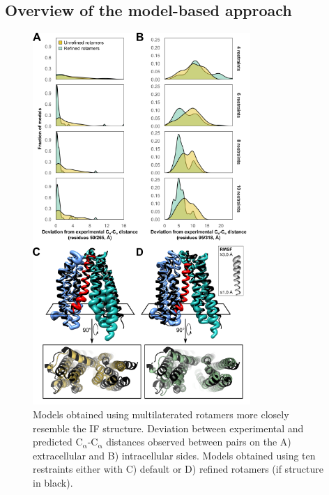 \subsection{Overview of the model-based approach}


\begin{figure}
\centering
\includegraphics[width=3.25in]{Figures/multilateration_main_convergence.pdf}
 \caption[Models obtained using multilaterated rotamers more closely resemble the IF structure.]{Models obtained using multilaterated rotamers more closely resemble the IF structure. Deviation between experimental and predicted $\mathrm{C_{\upalpha}}$-$\mathrm{C_{\upalpha}}$ distances observed between pairs on the A) extracellular and B) intracellular sides. Models obtained using ten restraints either with C) default or D) refined rotamers (\gls{if} structure in black).}
\label{fig:multilateration_main_convergence}
\end{figure}

